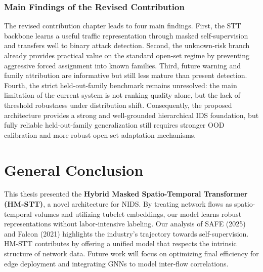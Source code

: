 \documentclass[12pt, a4paper]{report}
\begin{document}
\section{Main Findings of the Revised Contribution}

The revised contribution chapter leads to four main findings. First, the STT backbone learns a useful traffic representation through masked self-supervision and transfers well to binary attack detection. Second, the unknown-risk branch already provides practical value on the standard open-set regime by preventing aggressive forced assignment into known families. Third, future warning and family attribution are informative but still less mature than present detection. Fourth, the strict held-out-family benchmark remains unresolved: the main limitation of the current system is not ranking quality alone, but the lack of threshold robustness under distribution shift. Consequently, the proposed architecture provides a strong and well-grounded hierarchical IDS foundation, but fully reliable held-out-family generalization still requires stronger OOD calibration and more robust open-set adaptation mechanisms.































\part{General Conclusion}

This thesis presented the \textbf{Hybrid Masked Spatio-Temporal Transformer (HM-STT)}, a novel architecture for NIDS. By treating network flows as spatio-temporal volumes and utilizing tubelet embeddings, our model learns robust representations without labor-intensive labeling. Our analysis of SAFE (2025) and Falcon (2021) highlights the industry's trajectory towards self-supervision. HM-STT contributes by offering a unified model that respects the intrinsic structure of network data. Future work will focus on optimizing final efficiency for edge deployment and integrating GNNs to model inter-flow correlations.

\printbibliography
\end{document}
